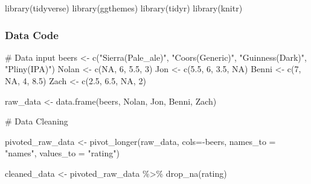 \documentclass[
  12,
  letterpaper,
  DIV=11,
  numbers=noendperiod]{scrartcl}
\newenvironment{Shaded}{\begin{snugshade}}{\end{snugshade}}
\newcommand{\AttributeTok}[1]{\textcolor[rgb]{0.40,0.45,0.13}{#1}}
\newcommand{\CommentTok}[1]{\textcolor[rgb]{0.37,0.37,0.37}{#1}}
\newcommand{\ConstantTok}[1]{\textcolor[rgb]{0.56,0.35,0.01}{#1}}
\newcommand{\DecValTok}[1]{\textcolor[rgb]{0.68,0.00,0.00}{#1}}
\newcommand{\FloatTok}[1]{\textcolor[rgb]{0.68,0.00,0.00}{#1}}
\newcommand{\FunctionTok}[1]{\textcolor[rgb]{0.28,0.35,0.67}{#1}}
\newcommand{\NormalTok}[1]{\textcolor[rgb]{0.00,0.23,0.31}{#1}}
\newcommand{\OtherTok}[1]{\textcolor[rgb]{0.00,0.23,0.31}{#1}}
\newcommand{\SpecialCharTok}[1]{\textcolor[rgb]{0.37,0.37,0.37}{#1}}
\newcommand{\StringTok}[1]{\textcolor[rgb]{0.13,0.47,0.30}{#1}}
\begin{document}
\begin{Shaded}
\begin{Highlighting}[]
\FunctionTok{library}\NormalTok{(tidyverse)}
\FunctionTok{library}\NormalTok{(ggthemes)}
\FunctionTok{library}\NormalTok{(tidyr)}
\FunctionTok{library}\NormalTok{(knitr)}
\end{Highlighting}
\end{Shaded}

\hypertarget{data-code}{%
\subsubsection{Data Code}\label{data-code}}

\begin{Shaded}
\begin{Highlighting}[]
\CommentTok{\# Data input}
\NormalTok{beers }\OtherTok{\textless{}{-}} \FunctionTok{c}\NormalTok{(}\StringTok{"Sierra(Pale\_ale)"}\NormalTok{, }\StringTok{"Coors(Generic)"}\NormalTok{, }\StringTok{"Guinness(Dark)"}\NormalTok{, }\StringTok{"Pliny(IPA)"}\NormalTok{)}
\NormalTok{Nolan }\OtherTok{\textless{}{-}} \FunctionTok{c}\NormalTok{(}\ConstantTok{NA}\NormalTok{, }\DecValTok{6}\NormalTok{, }\FloatTok{5.5}\NormalTok{, }\DecValTok{3}\NormalTok{)}
\NormalTok{Jon }\OtherTok{\textless{}{-}} \FunctionTok{c}\NormalTok{(}\FloatTok{5.5}\NormalTok{, }\DecValTok{6}\NormalTok{, }\FloatTok{3.5}\NormalTok{, }\ConstantTok{NA}\NormalTok{)}
\NormalTok{Benni }\OtherTok{\textless{}{-}} \FunctionTok{c}\NormalTok{(}\DecValTok{7}\NormalTok{, }\ConstantTok{NA}\NormalTok{, }\DecValTok{4}\NormalTok{, }\FloatTok{8.5}\NormalTok{)}
\NormalTok{Zach }\OtherTok{\textless{}{-}} \FunctionTok{c}\NormalTok{(}\FloatTok{2.5}\NormalTok{, }\FloatTok{6.5}\NormalTok{, }\ConstantTok{NA}\NormalTok{, }\DecValTok{2}\NormalTok{)}

\NormalTok{raw\_data }\OtherTok{\textless{}{-}} \FunctionTok{data.frame}\NormalTok{(beers, Nolan, Jon, Benni, Zach)}

\CommentTok{\# Data Cleaning}

\NormalTok{pivoted\_raw\_data }\OtherTok{\textless{}{-}} \FunctionTok{pivot\_longer}\NormalTok{(raw\_data,}
                        \AttributeTok{cols=}\SpecialCharTok{{-}}\NormalTok{beers,}
                        \AttributeTok{names\_to =} \StringTok{"names"}\NormalTok{,}
                        \AttributeTok{values\_to =} \StringTok{"rating"}\NormalTok{)}

\NormalTok{cleaned\_data }\OtherTok{\textless{}{-}}\NormalTok{ pivoted\_raw\_data }\SpecialCharTok{\%\textgreater{}\%} 
  \FunctionTok{drop\_na}\NormalTok{(rating)}
\end{Highlighting}
\end{Shaded}
\end{document}
